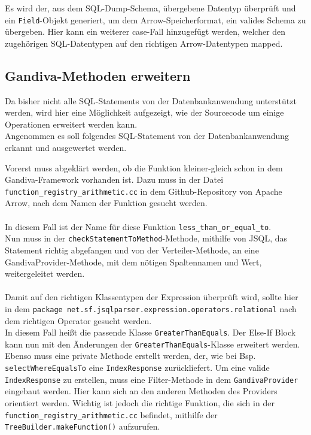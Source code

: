 Es wird der, aus dem SQL-Dump-Schema, übergebene Datentyp überprüft und ein \texttt{Field}-Objekt generiert, um dem Arrow-Speicherformat, ein valides Schema zu übergeben.
Hier kann ein weiterer case-Fall hinzugefügt werden, welcher den zugehörigen SQL-Datentypen auf den richtigen Arrow-Datentypen mapped.

\subsection{Gandiva-Methoden erweitern}

Da bisher nicht alle SQL-Statements von der Datenbankanwendung unterstützt werden, wird hier eine Möglichkeit aufgezeigt, wie der Sourcecode um einige Operationen erweitert werden kann.\\
Angenommen es soll folgendes SQL-Statement von der Datenbankanwendung erkannt und ausgewertet werden.

\begin{center}
\end{center}

Vorerst muss abgeklärt werden, ob die Funktion \glq{}kleiner-gleich\grq{} schon in dem Gandiva-Framework vorhanden ist. Dazu muss in der Datei \texttt{function\_registry\_arithmetic.cc} in dem Github-Repository von Apache Arrow, nach dem Namen der Funktion gesucht werden.\cite{Github:Arrow:functionregistry} \\\\

In diesem Fall ist der Name für diese Funktion \texttt{less\_than\_or\_equal\_to}.\\
Nun muss in der \texttt{checkStatementToMethod}-Methode, mithilfe von JSQL, das Statement richtig abgefangen und von der Verteiler-Methode, an eine GandivaProvider-Methode, mit dem nötigen Spaltennamen und Wert, weitergeleitet werden.\\\\

Damit auf den richtigen Klassentypen der Expression überprüft wird, sollte  hier in dem \texttt{package net.sf.jsqlparser.expression.operators.relational} nach dem richtigen Operator gesucht werden.\\
In diesem Fall heißt die passende Klasse \texttt{GreaterThanEquals}. Der Else-If Block kann nun mit den Änderungen der \texttt{GreaterThanEquals}-Klasse erweitert werden. Ebenso muss eine private Methode erstellt werden, der, wie bei Bsp. \texttt{selectWhereEqualsTo} eine \texttt{IndexResponse} zurückliefert.
Um eine valide \texttt{IndexResponse} zu erstellen, muss eine Filter-Methode in dem \texttt{GandivaProvider} eingebaut werden.
Hier kann sich an den anderen Methoden des Providers orientiert werden. Wichtig ist jedoch die richtige Funktion, die sich in der \texttt{function\_registry\_arithmetic.cc} befindet, mithilfe der \texttt{TreeBuilder.makeFunction()} aufzurufen.

